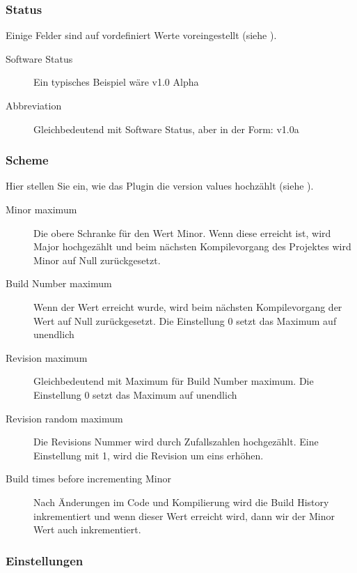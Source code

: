 \subsubsection{Status}

Einige Felder sind auf vordefiniert Werte voreingestellt (siehe ).

\begin{description}
\item[Software Status] Ein typisches Beispiel wäre v1.0 Alpha
\item[Abbreviation] Gleichbedeutend mit Software Status, aber in der Form: v1.0a
\end{description}


\subsubsection{Scheme}

Hier stellen Sie ein, wie das Plugin die version values hochzählt (siehe ).


\begin{description}
\item[Minor maximum] Die obere Schranke für den Wert Minor. Wenn diese erreicht ist, wird Major hochgezählt und beim nächsten Kompilevorgang des Projektes wird Minor auf Null zurückgesetzt.
\item[Build Number maximum] Wenn der Wert erreicht wurde, wird beim nächsten Kompilevorgang der Wert auf Null zurückgesetzt. Die Einstellung 0 setzt das Maximum auf unendlich
\item[Revision maximum] Gleichbedeutend mit Maximum für Build Number maximum. Die Einstellung 0 setzt das Maximum auf unendlich
\item[Revision random maximum] Die Revisions Nummer wird durch Zufallszahlen hochgezählt. Eine Einstellung mit 1, wird die Revision um eins erhöhen.
\item[Build times before incrementing Minor] Nach Änderungen im Code und Kompilierung wird die Build History inkrementiert und wenn dieser Wert erreicht wird, dann wir der Minor Wert auch inkrementiert.
\end{description}

\subsubsection{Einstellungen}

